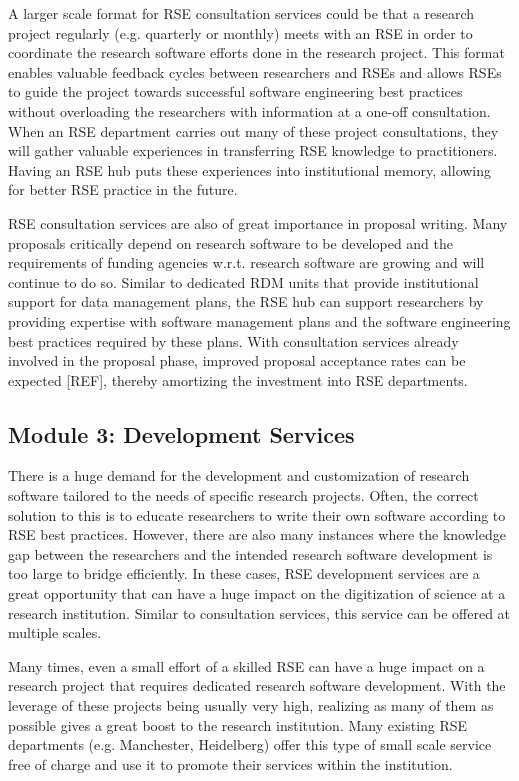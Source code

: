 \documentclass[a4paper]{article}
\makeatletter
\newcommand*{\eg}{e.g.\@\xspace}
\makeatother
\begin{document}
A larger scale format for RSE consultation services could be that a research project regularly (e.g. quarterly or monthly) meets with an RSE in order to coordinate the research software efforts done in the research project.
This format enables valuable feedback cycles between researchers and RSEs and allows RSEs to guide the project
towards successful software engineering best practices without overloading the researchers with information at a one-off consultation.
When an RSE department carries out many of these project consultations, they will gather valuable experiences in transferring RSE knowledge to practitioners.
Having an RSE hub puts these experiences into institutional memory, allowing for better RSE practice in the future.

RSE consultation services are also of great importance in proposal writing.
Many proposals critically depend on research software to be developed and the requirements of funding agencies w.r.t. research software are growing and will continue to do so.
Similar to dedicated RDM units that provide institutional support for data management plans,
the RSE hub can support researchers by providing expertise with software management plans and the software engineering best practices required by these plans.
With consultation services already involved in the proposal phase, improved proposal acceptance rates can be expected [REF], thereby amortizing the investment into RSE departments.


\subsection{Module 3: Development Services}
\label{sec:development}

There is a huge demand for the development and customization of research software tailored to the needs of specific research projects.
Often, the correct solution to this is to educate researchers to write their own software according to RSE best practices.
However, there are also many instances where the knowledge gap between the researchers and the intended research software development is too large to bridge efficiently.
In these cases, RSE development services are a great opportunity that can have a huge impact on the digitization of science at a research institution.
Similar to consultation services, this service can be offered at multiple scales.

Many times, even a small effort of a skilled RSE can have a huge impact on a research project that requires dedicated research software development.
With the leverage of these projects being usually very high, realizing as many of them as possible gives a great boost to the research institution.
Many existing RSE departments (\eg Manchester, Heidelberg) offer this type of small scale service free of charge and use it to promote their services within the institution.
\end{document}
